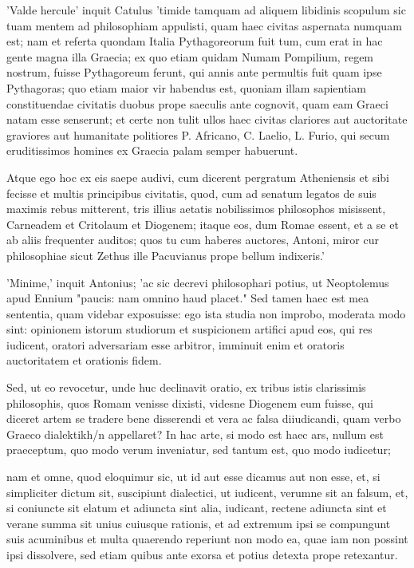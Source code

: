  'Valde hercule' inquit Catulus 'timide tamquam ad aliquem libidinis scopulum sic tuam mentem ad philosophiam appulisti, quam haec civitas aspernata numquam est; nam et referta quondam Italia Pythagoreorum fuit tum, cum erat in hac gente magna illa Graecia; ex quo etiam quidam Numam Pompilium, regem nostrum, fuisse Pythagoreum ferunt, qui annis ante permultis fuit quam ipse Pythagoras; quo etiam maior vir habendus est, quoniam illam sapientiam constituendae civitatis duobus prope saeculis ante cognovit, quam eam Graeci natam esse senserunt; et certe non tulit ullos haec civitas clariores aut auctoritate graviores aut humanitate politiores P. Africano, C. Laelio, L. Furio, qui secum eruditissimos homines ex Graecia palam semper habuerunt.

 Atque ego hoc ex eis saepe audivi, cum dicerent pergratum Atheniensis et sibi fecisse et multis principibus civitatis, quod, cum ad senatum legatos de suis maximis rebus mitterent, tris illius aetatis nobilissimos philosophos misissent, Carneadem et Critolaum et Diogenem; itaque eos, dum Romae essent, et a se et ab aliis frequenter auditos; quos tu cum haberes auctores, Antoni, miror cur philosophiae sicut Zethus ille Pacuvianus prope bellum indixeris.'

 'Minime,' inquit Antonius; 'ac sic decrevi philosophari potius, ut Neoptolemus apud Ennium "paucis: nam omnino haud placet." Sed tamen haec est mea sententia, quam videbar exposuisse: ego ista studia non improbo, moderata modo sint: opinionem istorum studiorum et suspicionem artifici apud eos, qui res iudicent, oratori adversariam esse arbitror, imminuit enim et oratoris auctoritatem et orationis fidem.

 Sed, ut eo revocetur, unde huc declinavit oratio, ex tribus istis clarissimis philosophis, quos Romam venisse dixisti, videsne Diogenem eum fuisse, qui diceret artem se tradere bene disserendi et vera ac falsa diiudicandi, quam verbo Graeco dialektikh/n appellaret? In hac arte, si modo est haec ars, nullum est praeceptum, quo modo verum inveniatur, sed tantum est, quo modo iudicetur;

 nam et omne, quod eloquimur sic, ut id aut esse dicamus aut non esse, et, si simpliciter dictum sit, suscipiunt dialectici, ut iudicent, verumne sit an falsum, et, si coniuncte sit elatum et adiuncta sint alia, iudicant, rectene adiuncta sint et verane summa sit unius cuiusque rationis, et ad extremum ipsi se compungunt suis acuminibus et multa quaerendo reperiunt non modo ea, quae iam non possint ipsi dissolvere, sed etiam quibus ante exorsa et potius detexta prope retexantur.

